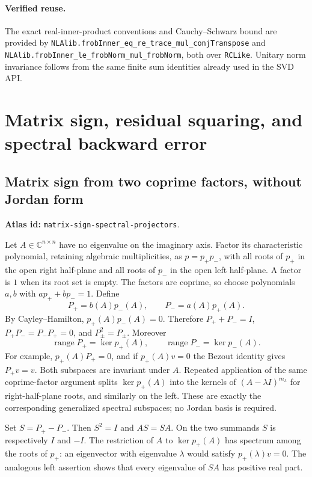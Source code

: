 \documentclass[11pt,a4paper]{article}
\newcommand{\C}{\mathbb C}
\DeclareRobustCommand{\code}[1]{{\footnotesize\urlstyle{tt}\nolinkurl{#1}}}
\begin{document}
\paragraph{Verified reuse.}
The exact real-inner-product conventions and Cauchy--Schwarz bound are
provided by \code{NLAlib.frobInner_eq_re_trace_mul_conjTranspose} and
\code{NLAlib.frobInner_le_frobNorm_mul_frobNorm}, both over
\code{RCLike}. Unitary norm invariance follows from the same finite
sum identities already used in the SVD API.

\section{Matrix sign, residual squaring, and spectral backward error}
\label{sec:eq-functions}

\subsection{Matrix sign from two coprime factors, without Jordan form}
\label{sec:eq-sign-projectors}
\textbf{Atlas id:} \code{matrix-sign-spectral-projectors}.

Let $A\in\C^{n\times n}$ have no eigenvalue on the imaginary axis.
Factor its characteristic polynomial, retaining algebraic multiplicities,
as $p=p_+p_-$, with all roots of $p_+$ in the open right half-plane and
all roots of $p_-$ in the open left half-plane. A factor is $1$ when
its root set is empty. The factors are coprime, so choose polynomials
$a,b$ with $ap_++bp_-=1$. Define
\[
 P_+=b(A)p_-(A),\qquad P_-=a(A)p_+(A).
\]
By Cayley--Hamilton, $p_+(A)p_-(A)=0$. Therefore
$P_++P_-=I$, $P_+P_-=P_-P_+=0$, and $P_\pm^2=P_\pm$.
Moreover
\[
 \operatorname{range}P_+=\ker p_+(A),\qquad
 \operatorname{range}P_-=\ker p_-(A).
\]
For example, $p_+(A)P_+=0$, and if $p_+(A)v=0$ the Bezout identity
gives $P_+v=v$. Both subspaces are invariant under $A$.
Repeated application of the same coprime-factor argument splits
$\ker p_+(A)$ into the kernels of $(A-\lambda I)^{m_\lambda}$ for
right-half-plane roots, and similarly on the left. These are exactly
the corresponding generalized spectral subspaces; no Jordan basis is
required.

Set $S=P_+-P_-$. Then $S^2=I$ and $AS=SA$. On the two summands $S$
is respectively $I$ and $-I$. The restriction of $A$ to
$\ker p_+(A)$ has spectrum among the roots of $p_+$: an eigenvector
with eigenvalue $\lambda$ would satisfy $p_+(\lambda)v=0$.
The analogous left assertion shows that every eigenvalue of $SA$ has
positive real part.
\end{document}
